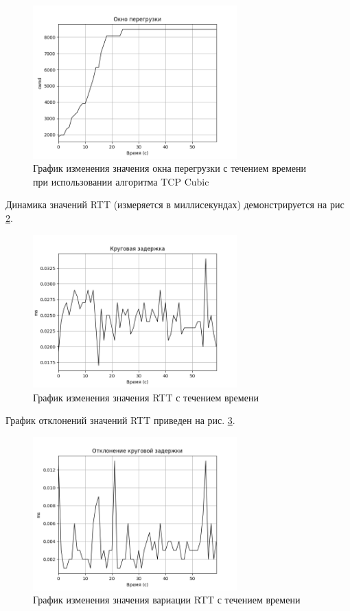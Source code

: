 \documentclass[
  13pt,
  fontsize=13pt,
  russian,
  a4paper,
,captions=tableheading
]{scrreprt}
\begin{document}
\begin{figure}
\hypertarget{fig:0015}{%
\centering
\includegraphics[width=0.7\textwidth,height=\textheight]{iperf_cwnd.png}
\caption{График изменения значения окна перегрузки с течением времени
при использовании алгоритма TCP Cubic}\label{fig:0015}
}
\end{figure}

Динамика значений RTT (измеряется в миллисекундах) демонстрируется на
рис \ref{fig:0017}.

\begin{figure}
\hypertarget{fig:0017}{%
\centering
\includegraphics[width=0.7\textwidth,height=\textheight]{iperf_rtt.png}
\caption{График изменения значения RTT с течением
времени}\label{fig:0017}
}
\end{figure}

График отклонений значений RTT приведен на рис. \ref{fig:0018}.

\begin{figure}
\hypertarget{fig:0018}{%
\centering
\includegraphics[width=0.7\textwidth,height=\textheight]{iperf_rttvar.png}
\caption{График изменения значения вариации RTT с течением
времени}\label{fig:0018}
}
\end{figure}
\end{document}
